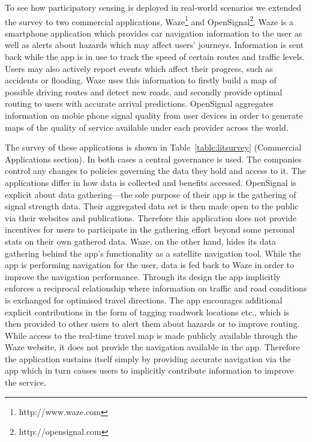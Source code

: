 To see how participatory sensing is deployed in real-world scenarios we extended the survey to two commercial applications, Waze\footnote{http://www.waze.com} and OpenSignal\footnote{http://opensignal.com}. Waze is a smartphone application which provides car navigation information to the user as well as alerts about hazards which may affect users' journeys. Information is sent back while the app is in use to track the speed of certain routes and traffic levels. Users may also actively report events which affect their progress, such as accidents or flooding. Waze uses this information to firstly build a map of possible driving routes and detect new roads, and secondly provide optimal routing to users with accurate arrival predictions. OpenSignal aggregates information on mobie phone signal quality from user devices in order to generate maps of the quality of service available under each provider across the world.

The survey of these applications is shown in Table~\ref{table:litsurvey} (Commercial Applications section). 
In both cases a central governance is used. The companies control any changes to policies governing the data they hold and access to it. The applications differ in how data is collected and benefits accessed. 
OpenSignal is explicit about data gathering---the sole purpose of their app is the gathering of signal strength data. 
Their aggregated data set is then made open to the public via their websites and publications. Therefore this application does not provide incentives for users to participate in the gathering effort beyond some personal stats on their own gathered data. Waze, on the other hand, hides its data gathering behind the app's functionality as a satellite navigation tool. 
While the app is performing navigation for the user, data is fed back to Waze in order to improve the navigation performance. 
Through its design the app implicitly enforces a reciprocal relationship where information on traffic and road conditions is exchanged for optimised travel directions. 
The app encourages additional explicit contributions in the form of tagging roadwork locations etc., which is then provided to other users to alert them about hazards or to improve routing. 
While access to the real-time travel map is made publicly available through the Waze website, it does not provide the navigation available in the app. Therefore the application sustains itself simply by providing accurate navigation via the app which in turn causes users to implicitly contribute information to improve the service.


